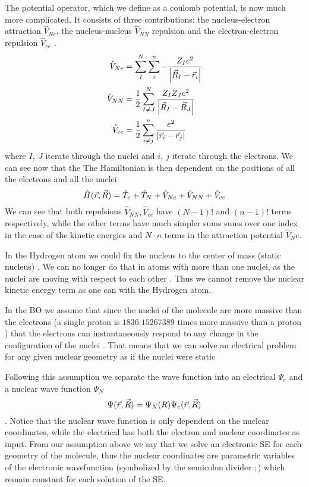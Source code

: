 \documentclass[../master_thesis.tex]{subfiles}
\begin{document}
The potential operator, which we define as a coulomb potential, is now much more
complicated. It consists of three contributions: the nucleus-electron attraction
$\hat{V}_{Ne}$, the nucleus-nucleus $\hat{V}_{NN}$ repulsion and the electron-electron
repulsion $\hat{V}_{ee}$ \cite{Cramer:2004}.
\begin{align}
  \hat{V}_{Ne} &= \sum^N_I\sum^n_{i}-\frac{Z_Ie^2}{\abs{\vec{R}_I - \vec{r}_i}}\\
  \hat{V}_{NN} &= \frac{1}{2}\sum^N_{I \neq J}\frac{Z_IZ_Je^2}{\abs{\vec{R}_I - \vec{R}_J}}\\
  \hat{V}_{ee} &= \frac{1}{2}\sum^n_{i \neq j} \frac{e^2}{\abs{\vec{r}_i - \vec{r}_j}}
\end{align}
where $I,\ J$ iterate through the nuclei and $i, \ j$ iterate through the electrons.
We can see now that the
The Hamiltonian is then dependent on the positions of all the electrons and all
the nuclei \cite{Jensen:2017}
\begin{equation}
  \hat{H}(\vec{r}, \vec{R}) = \hat{T}_e + \hat{T}_N + \hat{V}_{Ne} +\hat{V}_{NN} + \hat{V}_{ee}
\end{equation}
We can see that both repulsions $\hat{V}_{NN}, \hat{V}_{ee}$ have $(N - 1)!$ and $(n - 1)!$ terms
 respectively, while the other terms have much simpler sums {sums over one index in the case of the
kinetic energies and $N\cdot n$ terms in the attraction potential $\hat{V}_Ne$}.

In the Hydrogen atom we could fix the nucleus to the center of mass (static nucleus)
\cite{Jensen:2017}. We can no longer do that in atoms with more than one nuclei, as
the nuclei are moving with respect to each other \cite{Cramer:2004}. Thus we cannot
remove the nuclear kinetic energy term as one can with the Hydrogen atom.

In the \ac{BO}  we assume that since the nuclei of the molecule are more massive
than the electrons (a single proton is $1836.152 673 89$ times more massive
than a proton \cite{NIST:2019}) that the electrons can instantaneously respond to
any change in the configuration of the nuclei \cite{Atkins:2011}. That means that we can solve an
electrical problem for any given nuclear geometry as if the nuclei were static
\cite{Cramer:2004, Jensen:2017, Atkins:2014m}

Following this  assumption we separate the wave function into an electrical
$\Psi_e$ and a nuclear wave function $\Psi_N$
\begin{equation}
  \Psi(\vec{r}, \vec{R}) = \Psi_N(R)\Psi_e(\vec{r}; \vec{R})
\end{equation}.
Notice that the nuclear wave function is only dependent on the nuclear coordinates,
while the electrical has both the electron and nuclear coordinates as input. From
our assumption above we say that we solve an electronic \ac{SE} for each geometry
of the molecule, thus the nuclear coordinates  are parametric variables of
the electronic wavefunction (symbolized by the semicolon divider $;$) which remain
constant for each solution of the \ac{SE}.
\end{document}
